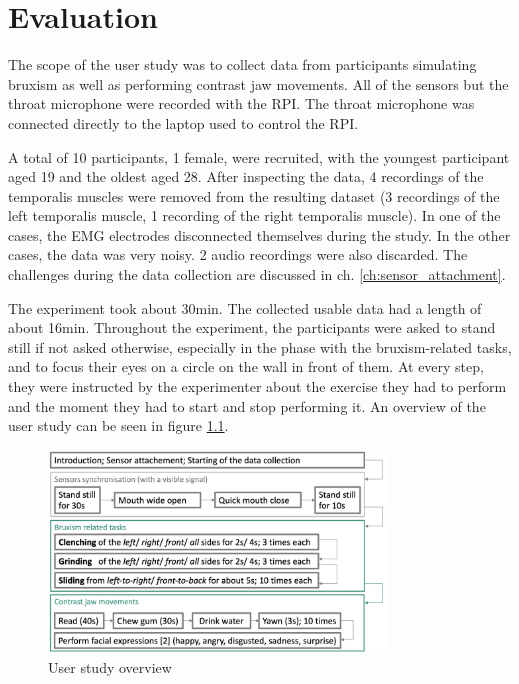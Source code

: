 \chapter{Evaluation}
\label{ch:study}

The scope of the user study was to collect data from participants simulating bruxism as well as performing contrast jaw movements. All of the sensors but the throat microphone were recorded with the RPI. The throat microphone was connected directly to the laptop used to control the RPI.

A total of 10 participants, 1 female, were recruited, with the youngest participant aged 19 and the oldest aged 28. After inspecting the data, 4 recordings of the temporalis muscles were removed from the resulting dataset (3 recordings of the left temporalis muscle, 1 recording of the right temporalis muscle). In one of the cases, the EMG electrodes disconnected themselves during the study. In the other cases, the data was very noisy. 2 audio recordings were also discarded. The challenges during the data collection are discussed in ch. \ref{ch:sensor_attachment}. 

The experiment took about 30min. The collected usable data had a length of about 16min. Throughout the experiment, the participants were asked to stand still if not asked otherwise, especially in the phase with the bruxism-related tasks, and to focus their eyes on a circle on the wall in front of them. At every step, they were instructed by the experimenter about the exercise they had to perform and the moment they had to start and stop performing it. An overview of the user study can be seen in figure \ref{image:study_overview}.

\begin{figure}[h]
\centering
\includegraphics[width=0.8\textwidth]{src/media/study/study_overview.png}
\caption{User study overview}
\label{image:study_overview}
\end{figure}

